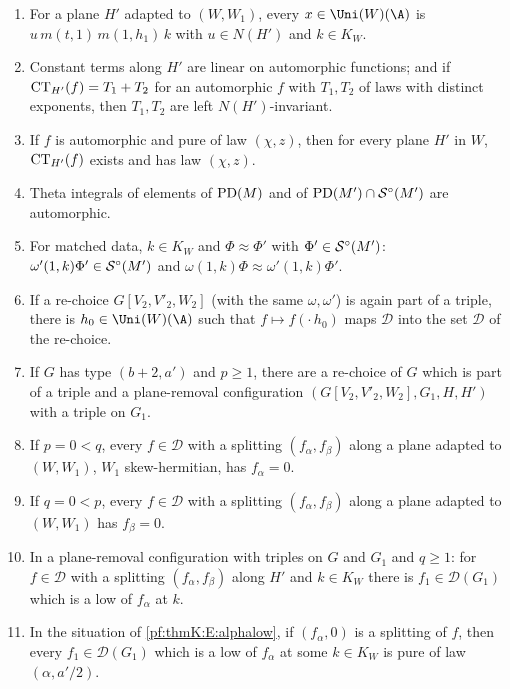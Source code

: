 \begin{enumerate}[label=(E\arabic*)]
\item\label{pf:thmK:E:iwa} For a plane $H'$ adapted to $(W,W_1)$, every $x\in\Uni(W)(\A)$ is $u\,m(t,1)\,m(1,h_1)\,k$ with
$u\in N(H')$ and $k\in K_W$.
\item\label{pf:thmK:E:ct} Constant terms along $H'$ are linear on automorphic functions; and if $\operatorname{CT}_{H'}(f)=T_1+T_2$ for
an automorphic $f$ with $T_1,T_2$ of laws with distinct exponents, then $T_1,T_2$ are left $N(H')$-invariant.
\item\label{pf:thmK:E:linemove} If $f$ is automorphic and pure of law $(\chi,z)$, then for every plane $H'$ in $W$,
$\operatorname{CT}_{H'}(f)$ exists and has law $(\chi,z)$.
\item\label{pf:thmK:E:aut} Theta integrals of elements of $\operatorname{PD}(M)$ and of $\operatorname{PD}(M')\cap\mathcal{S}^{\circ}(M')$ are automorphic.
\item\label{pf:thmK:E:stab} For matched data, $k\in K_W$ and $\Phi\approx\Phi'$ with $\Phi'\in\mathcal{S}^{\circ}(M')$:
$\omega'(1,k)\Phi'\in\mathcal{S}^{\circ}(M')$ and $\omega(1,k)\Phi\approx\omega'(1,k)\Phi'$.
\item\label{pf:thmK:E:sigre} If a re-choice $G[V_2,V'_2,W_2]$ (with the same $\omega,\omega'$) is again part of a triple, there
is $h_0\in\Uni(W)(\A)$ such that $f\mapsto f(\cdot\,h_0)$ maps $\mathcal D$ into the set $\mathcal D$ of the re-choice.
\item\label{pf:thmK:E:tower2} If $G$ has type $(b+2,a')$ and $p\ge1$, there are a re-choice of $G$ which is part of a triple
and a plane-removal configuration $(G[V_2,V'_2,W_2],G_1,H,H')$ with a triple on $G_1$.
\item\label{pf:thmK:E:alphazero} If $p=0<q$, every $f\in\mathcal D$ with a splitting $(f_\alpha,f_\beta)$ along a plane
adapted to $(W,W_1)$, $W_1$ skew-hermitian, has $f_\alpha=0$.
\item\label{pf:thmK:E:beta} If $q=0<p$, every $f\in\mathcal D$ with a splitting $(f_\alpha,f_\beta)$ along a plane adapted to
$(W,W_1)$ has $f_\beta=0$.
\item\label{pf:thmK:E:alphalow} In a plane-removal configuration with triples on $G$ and $G_1$ and $q\ge1$: for $f\in
\mathcal D$ with a splitting $(f_\alpha,f_\beta)$ along $H'$ and $k\in K_W$ there is $f_1\in\mathcal D(G_1)$ which is a low of
$f_\alpha$ at $k$.
\item\label{pf:thmK:E:twostep} In the situation of \ref{pf:thmK:E:alphalow}, if $(f_\alpha,0)$ is a splitting of $f$, then
every $f_1\in\mathcal D(G_1)$ which is a low of $f_\alpha$ at some $k\in K_W$ is pure of law $(\alpha,a'/2)$.

\end{enumerate}
